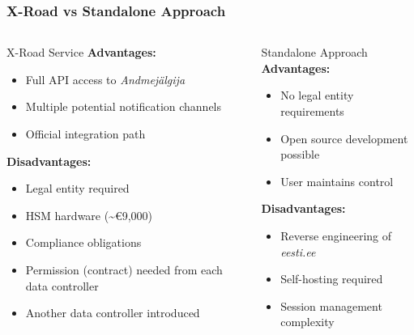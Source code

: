 \documentclass[aspectratio=169,11pt]{beamer}
\begin{document}
\begin{frame}
\frametitle{X-Road vs Standalone Approach}
\begin{columns}[t]
\begin{column}{0.47\textwidth}
\begin{block}{X-Road Service}
\textbf{Advantages:}
\begin{itemize}
    \item Full API access to \textit{Andmejälgija}
    \item Multiple potential notification channels
    \item Official integration path
\end{itemize}

\textbf{Disadvantages:}
\begin{itemize}
    \item Legal entity required
    \item HSM hardware (\textasciitilde€9,000)
    \item Compliance obligations
    \item Permission (contract) needed from each data controller
    \item Another data controller introduced
\end{itemize}
\end{block}
\end{column}
\begin{column}{0.47\textwidth}
\begin{block}{Standalone Approach}
\textbf{Advantages:}
\begin{itemize}
    \item No legal entity requirements
    \item Open source development possible
    \item User maintains control
\end{itemize}

\textbf{Disadvantages:}
\begin{itemize}
    \item Reverse engineering of \textit{eesti.ee}
    \item Self-hosting required
    \item Session management complexity
\end{itemize}
\end{block}
\end{column}
\end{columns}
\end{frame}
\end{document}
